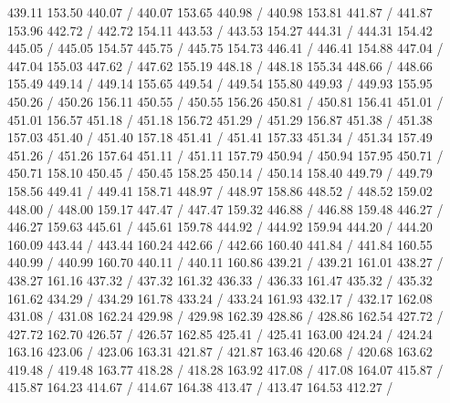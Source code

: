 { 439.11 153.50 440.07 /
 440.07 153.65 440.98 /
 440.98 153.81 441.87 /
 441.87 153.96 442.72 /
 442.72 154.11 443.53 /
 443.53 154.27 444.31 /
 444.31 154.42 445.05 /
 445.05 154.57 445.75 /
 445.75 154.73 446.41 /
 446.41 154.88 447.04 /
 447.04 155.03 447.62 /
 447.62 155.19 448.18 /
 448.18 155.34 448.66 /
 448.66 155.49 449.14 /
 449.14 155.65 449.54 /
 449.54 155.80 449.93 /
 449.93 155.95 450.26 /
 450.26 156.11 450.55 /
 450.55 156.26 450.81 /
 450.81 156.41 451.01 /
 451.01 156.57 451.18 /
 451.18 156.72 451.29 /
 451.29 156.87 451.38 /
 451.38 157.03 451.40 /
 451.40 157.18 451.41 /
 451.41 157.33 451.34 /
 451.34 157.49 451.26 /
 451.26 157.64 451.11 /
 451.11 157.79 450.94 /
 450.94 157.95 450.71 /
 450.71 158.10 450.45 /
 450.45 158.25 450.14 /
 450.14 158.40 449.79 /
 449.79 158.56 449.41 /
 449.41 158.71 448.97 /
 448.97 158.86 448.52 /
 448.52 159.02 448.00 /
 448.00 159.17 447.47 /
 447.47 159.32 446.88 /
 446.88 159.48 446.27 /
 446.27 159.63 445.61 /
 445.61 159.78 444.92 /
 444.92 159.94 444.20 /
 444.20 160.09 443.44 /
 443.44 160.24 442.66 /
 442.66 160.40 441.84 /
 441.84 160.55 440.99 /
 440.99 160.70 440.11 /
 440.11 160.86 439.21 /
 439.21 161.01 438.27 /
 438.27 161.16 437.32 /
 437.32 161.32 436.33 /
 436.33 161.47 435.32 /
 435.32 161.62 434.29 /
 434.29 161.78 433.24 /
 433.24 161.93 432.17 /
 432.17 162.08 431.08 /
 431.08 162.24 429.98 /
 429.98 162.39 428.86 /
 428.86 162.54 427.72 /
 427.72 162.70 426.57 /
 426.57 162.85 425.41 /
 425.41 163.00 424.24 /
 424.24 163.16 423.06 /
 423.06 163.31 421.87 /
 421.87 163.46 420.68 /
 420.68 163.62 419.48 /
 419.48 163.77 418.28 /
 418.28 163.92 417.08 /
 417.08 164.07 415.87 /
 415.87 164.23 414.67 /
 414.67 164.38 413.47 /
 413.47 164.53 412.27 /
}
